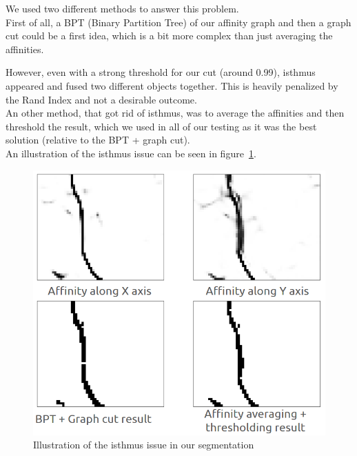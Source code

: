We used two different methods to answer this problem.\\
First of all, a BPT (Binary Partition Tree) of our affinity graph and then a
graph cut could be a first idea, which is a bit more complex than just
averaging the affinities. 

However, even with a strong threshold for our cut (around 0.99), isthmus appeared and fused two different objects together.
This is heavily penalized by the Rand Index and not a desirable outcome.\\
An other method, that got rid of isthmus, was to average the affinities and
then threshold the result, which we used in all of our testing as it was the best solution
(relative to the BPT + graph cut).\\
An illustration of the isthmus issue can be seen in
figure~\ref{fig:cremi_isthmus}.


\begin{figure}[!htbp]
	\centering
	\includegraphics[width=0.7\linewidth]{./images/cremi_isthmus.png}
	\caption{Illustration of the isthmus issue in our segmentation}%
	\label{fig:cremi_isthmus}
\end{figure}


